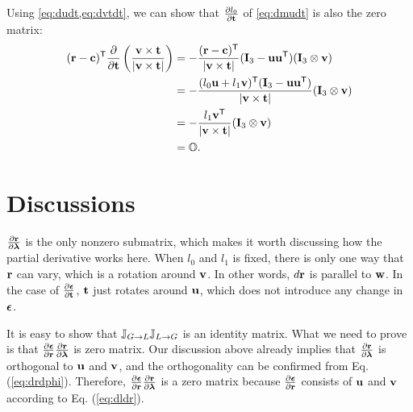\documentclass[12pt,a4paper]{scrarticle}
\newcommand{\pdiff}[2]{\ensuremath{\mathchoice
{\frac{\partial{#1}}{\partial{#2}}}%
{\frac{\partial{#1}}{\partial{#2}}}%
{\nicefrac{\partial{#1}}{\partial{#2}}}%
{\nicefrac{\partial{#1}}{\partial{#2}}}}}
\newcommand{\transpose}[1]{\ensuremath{#1^{\mathsf{T}}}}
\begin{document}
Using \cref{eq:dudt,eq:dvtdt}, we can show that $\pdiff{\ulocal}{\dir}$ of \cref{eq:dmudt} is also the zero matrix:
\begin{align}
\transpose{(\pos - \surfaceCenter)}\pdiff{}{\dir} \left( \frac{\vbasis \times \dir}{|\vbasis \times \dir|} \right) & =
-\frac{\transpose{(\pos - \surfaceCenter)} }{|\vbasis \times \dir|}(\identityMatrix_3 - \ubasis \transpose{\ubasis})(\identityMatrix_3 \otimes \vbasis) \nonumber \\
& = - \frac{\transpose{(\ulocal \ubasis + \vlocal \vbasis)} (\identityMatrix_3 - \ubasis \transpose{\ubasis}) }{|\vbasis \times \dir|} (\identityMatrix_3 \otimes \vbasis)  \nonumber \\
& = -\frac{\vlocal \transpose{\vbasis}}{|\vbasis \times \dir|}(\identityMatrix_3 \otimes \vbasis) \nonumber \\
& = \zeroMatrix.
\end{align}


\section{Discussions}

$\frac{\partial{\mathbf{r}}}{\partial{\boldsymbol{\lambda}}}$ is the only nonzero submatrix, which makes it worth discussing how the partial derivative works here. When $l_0$ and $l_1$ is fixed, there is only one way that $\mathbf{r}$ can vary, which is a rotation around $\mathbf{v}$. In other words, $d\mathbf{r}$ is parallel to $\mathbf{w}$. In the case of $\frac{\partial{\boldsymbol{\epsilon}}}{\partial{\mathbf{t}}}$, $\mathbf{t}$ just rotates around $\mathbf{u}$, which does not introduce any change in $\boldsymbol{\epsilon}$.

It is easy to show that $\mathbb{J}_{G \rightarrow L}\mathbb{J}_{L \rightarrow G}$ is an identity matrix. What we need to prove is that $\frac{\partial{\boldsymbol{\epsilon}}}{\partial{\mathbf{r}}} \frac{\partial{\mathbf{r}}}{\partial{\boldsymbol{\lambda}}}$ is zero matrix.  Our discussion above already implies that $\frac{\partial{\mathbf{r}}}{\partial{\boldsymbol{\lambda}}}$ is orthogonal to $\mathbf{u}$ and $\mathbf{v}$, and the orthogonality can be confirmed from Eq. (\ref{eq:drdphi}). Therefore, $\frac{\partial{\boldsymbol{\epsilon}}}{\partial{\mathbf{r}}} \frac{\partial{\mathbf{r}}}{\partial{\boldsymbol{\lambda}}}$ is a zero matrix because $\frac{\partial{\boldsymbol{\epsilon}}}{\partial{\mathbf{r}}}$ consists of $\mathbf{u}$ and $\mathbf{v}$ according to Eq. (\ref{eq:dldr}).
\end{document}
